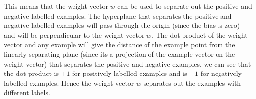 \begin{enumerate}
This means that the weight vector $w$ can be used to separate out the positive and negative labelled examples. The hyperplane that separates the positive and negative labelled examples will pass through the origin (since the bias is zero) and will be perpendicular to the weight vector $w$. The dot product of the weight vector and any example will give the distance of the example point from the linearly separating plane (since it\textquotesingle s a projection of the example vector on the weight vector) that separates the positive and negative examples, we can see that the dot product is $+1$ for positively labelled examples and is $-1$ for negatively labelled examples. Hence the weight vector $w$ separates out the examples with different labels.
\end{enumerate}

